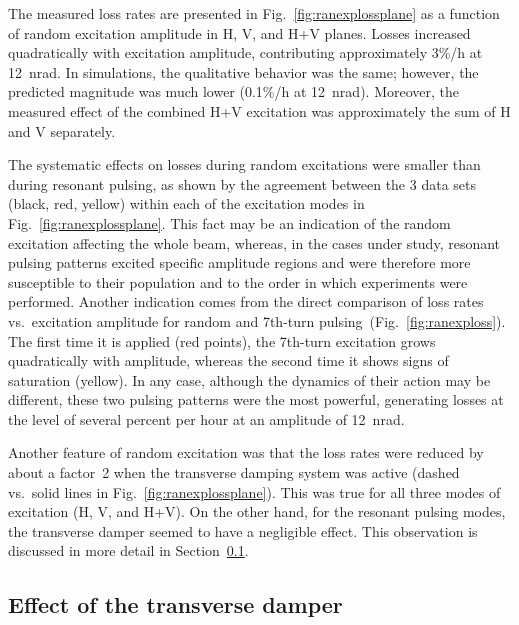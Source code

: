 \documentclass[aps
,prstab
,reprint
,longbibliography
,preprintnumbers
,showkeys
,amsfonts,amssymb,amsmath
,floatfix
]{revtex4-1}
\newcommand{\seventhtp}{7th-turn pulsing}
\begin{document}
The measured loss rates are presented in
Fig.~\ref{fig:ranexplossplane} as a function of random excitation
amplitude in H, V, and H+V planes.  Losses increased quadratically
with excitation amplitude, contributing approximately 3\%/h at
12~nrad. In simulations, the qualitative behavior was the same;
however, the predicted magnitude was much lower (0.1\%/h at
12~nrad). Moreover, the measured effect of the combined H+V excitation
was approximately the sum of H and V separately.

The systematic effects on losses during random excitations were
smaller than during resonant pulsing, as shown by the agreement
between the 3 data sets (black, red, yellow) within each of the
excitation modes in Fig.~\ref{fig:ranexplossplane}. This fact may be
an indication of the random excitation affecting the whole beam,
whereas, in the cases under study, resonant pulsing patterns excited
specific amplitude regions and were therefore more susceptible to
their population and to the order in which experiments were
performed. Another indication comes from the direct comparison of loss
rates vs.\ excitation amplitude for random and \seventhtp\
(Fig.~\ref{fig:ranexploss}). The first time it is applied (red
points), the 7th-turn excitation grows quadratically with amplitude,
whereas the second time it shows signs of saturation (yellow). In any
case, although the dynamics of their action may be different, these
two pulsing patterns were the most powerful, generating losses at the
level of several percent per hour at an amplitude of 12~nrad.

Another feature of random excitation was that the loss rates were
reduced by about a factor~2 when the transverse damping system was
active (dashed vs.\ solid lines in
Fig.~\ref{fig:ranexplossplane}). This was true for all three modes of
excitation (H, V, and H+V). On the other hand, for the resonant
pulsing modes, the transverse damper seemed to have a negligible
effect. This observation is discussed in more detail in
Section~\ref{sec:damp}.



\subsection{Effect of the transverse damper}
\label{sec:damp}
\end{document}
